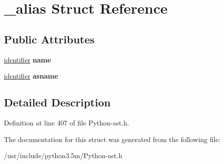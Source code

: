 \hypertarget{struct__alias}{}\section{\+\_\+alias Struct Reference}
\label{struct__alias}
\subsection*{Public Attributes}
\begin{DoxyCompactItemize}
\item 
\hyperlink{struct__object}{identifier} {\bfseries name}\hypertarget{struct__alias_af317c19681cf1e813594be225bedeb4f}{}\label{struct__alias_af317c19681cf1e813594be225bedeb4f}

\item 
\hyperlink{struct__object}{identifier} {\bfseries asname}\hypertarget{struct__alias_af2fcbe1eeb356bd031f49869bdcd8a7e}{}\label{struct__alias_af2fcbe1eeb356bd031f49869bdcd8a7e}

\end{DoxyCompactItemize}


\subsection{Detailed Description}


Definition at line 407 of file Python-\/ast.\+h.



The documentation for this struct was generated from the following file\+:\begin{DoxyCompactItemize}
\item 
/usr/include/python3.\+5m/Python-\/ast.\+h\end{DoxyCompactItemize}
